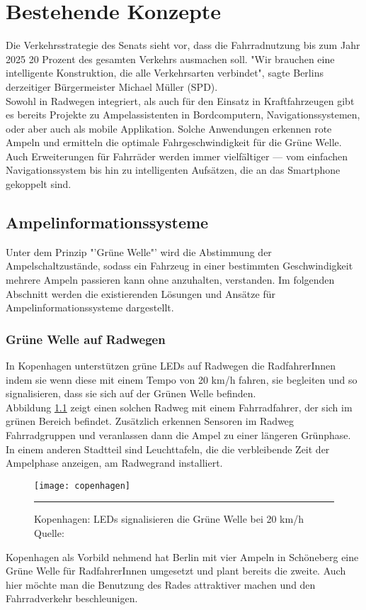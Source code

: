 \chapter{\label{chap:state}Bestehende Konzepte}
Die Verkehrsstrategie des Senats sieht vor, dass die Fahrradnutzung bis zum Jahr 2025 20 Prozent des gesamten Verkehrs ausmachen soll. "Wir brauchen eine intelligente Konstruktion, die alle Verkehrsarten verbindet", sagte Berlins derzeitiger Bürgermeister Michael Müller (SPD). \cite{Mopo}\\
Sowohl in Radwegen integriert, als auch für den Einsatz in Kraftfahrzeugen gibt es bereits Projekte zu Ampelassistenten in Bordcomputern, Navigationssystemen, oder aber auch als mobile Applikation. Solche Anwendungen erkennen rote Ampeln und ermitteln die optimale Fahrgeschwindigkeit für die Grüne Welle. Auch Erweiterungen für Fahrräder werden immer vielfältiger --- vom einfachen Navigationssystem bis hin zu intelligenten Aufsätzen, die an das \gls{Smartphone} gekoppelt sind.
\section{Ampelinformationssysteme}
Unter dem Prinzip "'Grüne Welle"' wird die Abstimmung der Ampelschaltzustände, sodass ein Fahrzeug in einer bestimmten Geschwindigkeit mehrere Ampeln passieren kann ohne anzuhalten, verstanden. Im folgenden Abschnitt werden die existierenden Lösungen und Ansätze für Ampelinformationssysteme dargestellt.
\subsection{Grüne Welle auf Radwegen}
In Kopenhagen unterstützen grüne \glspl{LED} auf Radwegen die RadfahrerInnen indem sie wenn diese mit einem Tempo von 20 km/h fahren, sie begleiten und so signalisieren, dass sie sich auf der Grünen Welle befinden.\\
Abbildung \ref{fig:copenhagen} zeigt einen solchen Radweg mit einem Fahrradfahrer, der sich im grünen Bereich befindet. Zusätzlich erkennen Sensoren im Radweg Fahrradgruppen und veranlassen dann die Ampel zu einer längeren Grünphase. In einem anderen Stadtteil sind Leuchttafeln, die die verbleibende Zeit der Ampelphase anzeigen, am Radwegrand installiert\cite{KopIng}.
\begin{figure}[H]  
    \centering  
    \texttt{[image: copenhagen]} 
    \rule{35em}{0.5pt}   
    \caption[Grüne Welle durch \glspl{LED}]{Kopenhagen: \glspl{LED} signalisieren die Grüne Welle bei 20 km/h  Quelle: \cite{NYT}}
     \label{fig:copenhagen}
\end{figure}
Kopenhagen als Vorbild nehmend hat Berlin mit vier Ampeln in Schöneberg eine Grüne Welle für RadfahrerInnen umgesetzt und plant bereits die zweite\cite{BZ}. Auch hier möchte man die Benutzung des Rades attraktiver machen und den Fahrradverkehr beschleunigen.
